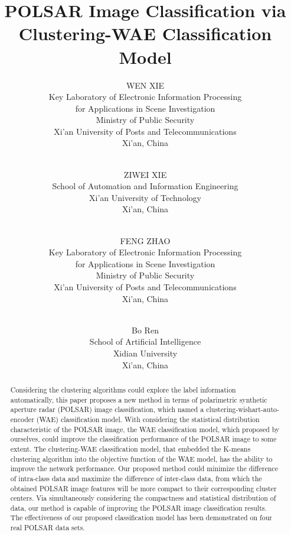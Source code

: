 \documentclass[11pt, a4paper, onecolumn, oneside]{article}
\begin{document}
\title{POLSAR Image Classification via Clustering-WAE Classification Model}
\author{WEN XIE\\
Key Laboratory of Electronic Information Processing\\ for Applications in Scene Investigation\\
Ministry of Public Security\\
Xi’an University of Posts and Telecommunications\\
Xi’an, China \and \\
ZIWEI XIE\\
School of Automation and Information Engineering\\
Xi’an University of Technology\\
Xi’an, China \and \\
FENG ZHAO\\
Key Laboratory of Electronic Information Processing\\ for Applications in Scene Investigation\\
Ministry of Public Security\\
Xi’an University of Posts and Telecommunications\\
Xi’an, China\and \\
Bo Ren\\
School of Artificial Intelligence\\
Xidian University\\
Xi’an, China}

\maketitle

\begin{abstract}
Considering the clustering algorithms could explore the label information automatically, this paper proposes a new method in terms of polarimetric synthetic aperture radar (POLSAR) image classification, which named a clustering-wishart-auto-encoder (WAE) classification model. With considering the statistical distribution characteristic of the POLSAR image, the WAE classification model, which proposed by ourselves, could improve the classification performance of the POLSAR image to some extent. The clustering-WAE classification model, that embedded the K-means clustering algorithm into the objective function of the WAE model, has the ability to improve the network performance. Our proposed method could minimize the difference of intra-class data and maximize the difference of inter-class data, from which the obtained POLSAR image features will be more compact to their corresponding cluster centers. Via simultaneously considering the compactness and statistical distribution of data, our method is capable of improving the POLSAR image classification results. The effectiveness of our proposed classification model has been demonstrated on four real POLSAR data sets.
\end{abstract}
\end{document}
